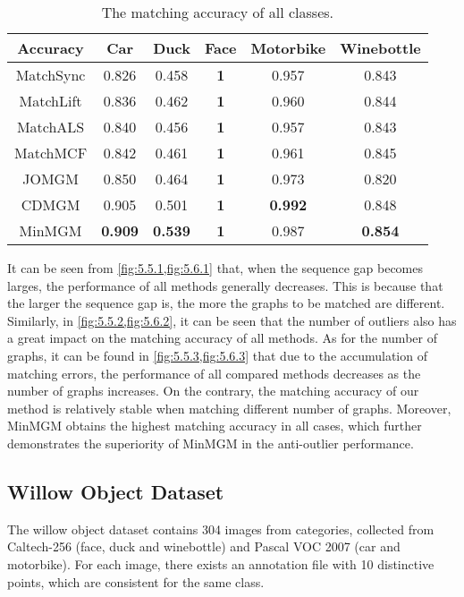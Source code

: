\begin{table*}[htbp!]
    \centering
    \small
    \begin{tabular}{cccccc}
    \hline
    Accuracy  & Car            & Duck           & Face       & Motorbike      & Winebottle     \\ \hline
    MatchSync & 0.826 & 0.458 & \textbf{1} & 0.957 & 0.843 \\ 
    MatchLift & 0.836 & 0.462 & \textbf{1} & 0.960 & 0.844 \\ 
    MatchALS  & 0.840 & 0.456 & \textbf{1} & 0.957 & 0.843 \\ 
    MatchMCF  & 0.842 & 0.461 & \textbf{1} & 0.961 & 0.845 \\ 
    JOMGM     & 0.850 & 0.464 & \textbf{1} & 0.973 & 0.820 \\ 
    CDMGM     & 0.905 & 0.501 & \textbf{1} & \textbf{0.992} & 0.848 \\ 
    MinMGM    & \textbf{0.909} & \textbf{0.539} & \textbf{1} & 0.987 & \textbf{0.854}\\\hline
    \end{tabular}
    \caption{The matching accuracy of all classes.}
    \label{tab:5.1}
\end{table*}

It can be seen from \cref{fig:5.5.1,fig:5.6.1} that, when the sequence gap becomes larges, the performance of all methods generally decreases. This is because that the larger the sequence gap is, the more the graphs to be matched are different. Similarly, in \cref{fig:5.5.2,fig:5.6.2}, it can be seen that the number of outliers also has a great impact on the matching accuracy of all methods. As for the number of graphs, it can be found in \cref{fig:5.5.3,fig:5.6.3} that due to the accumulation of matching errors, the performance of all compared methods decreases as the number of graphs increases. On the contrary, the matching accuracy of our method is relatively stable when matching different number of graphs. Moreover, MinMGM obtains the highest matching accuracy in all cases, which further demonstrates the superiority of MinMGM in the anti-outlier performance.

\subsection{Willow Object Dataset}

The willow object dataset \cite{willow} contains 304 images from categories, collected from Caltech-256 \cite{caltech} (face, duck and winebottle) and Pascal VOC 2007 \cite{voc2007} (car and motorbike). For each image, there exists an annotation file with 10 distinctive points, which are consistent for the same class.

